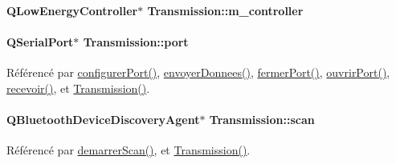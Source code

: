 \paragraph[{\texorpdfstring{m\+\_\+controller}{m_controller}}]{\setlength{\rightskip}{0pt plus 5cm}Q\+Low\+Energy\+Controller$\ast$ Transmission\+::m\+\_\+controller\hspace{0.3cm}{\ttfamily [private]}}\hypertarget{class_transmission_a9b056d8291609ec049b91d0aed8e408a}{}\label{class_transmission_a9b056d8291609ec049b91d0aed8e408a}
\paragraph[{\texorpdfstring{port}{port}}]{\setlength{\rightskip}{0pt plus 5cm}Q\+Serial\+Port$\ast$ Transmission\+::port\hspace{0.3cm}{\ttfamily [private]}}\hypertarget{class_transmission_a0ec8a06c44492c9b4f395e7c3b1e57b9}{}\label{class_transmission_a0ec8a06c44492c9b4f395e7c3b1e57b9}


Référencé par \hyperlink{class_transmission_ab4e82ab30c181a8e0d0c0257ea0e1f56}{configurer\+Port()}, \hyperlink{class_transmission_a21e35372ada18cd35411c0e8c0984fd7}{envoyer\+Donnees()}, \hyperlink{class_transmission_a14d36ad615852d6b630fbddf5787f3a3}{fermer\+Port()}, \hyperlink{class_transmission_a41d15e65be472e058b28869f8dfad392}{ouvrir\+Port()}, \hyperlink{class_transmission_aa54a695d9d1c728ccab04f1d8030da41}{recevoir()}, et \hyperlink{class_transmission_a1d8087d2d09b9ddd4fd6e8261daed9f3}{Transmission()}.

\paragraph[{\texorpdfstring{scan}{scan}}]{\setlength{\rightskip}{0pt plus 5cm}Q\+Bluetooth\+Device\+Discovery\+Agent$\ast$ Transmission\+::scan\hspace{0.3cm}{\ttfamily [private]}}\hypertarget{class_transmission_a70e442ca9125041564f79c40230ecd08}{}\label{class_transmission_a70e442ca9125041564f79c40230ecd08}


Référencé par \hyperlink{class_transmission_a217b97344fdad09dbe226c55a8ac56b0}{demarrer\+Scan()}, et \hyperlink{class_transmission_a1d8087d2d09b9ddd4fd6e8261daed9f3}{Transmission()}.

